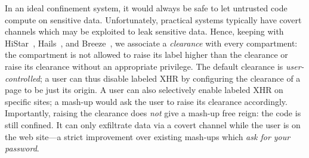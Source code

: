 In an ideal confinement system, it would always be safe to let untrusted
code compute on sensitive data.
%
Unfortunately, practical systems typically have covert channels which
may be exploited to leak sensitive data.
%
Hence, keeping with HiStar~\cite{Zeldovich:2006},
Hails~\cite{giffin:2012:hails}, and Breeze~\cite{Breeze13}, we associate
a \emph{clearance} with every compartment: the compartment is not
allowed to raise its label higher than the clearance or raise its
clearance without an appropriate privilege.
%
The default clearance is \emph{user-controlled}; a user can thus disable
labeled XHR by configuring the clearance of a page to be just
its origin.
%
A user can also selectively enable labeled XHR on specific sites; a
mash-up would ask the user to raise its clearance accordingly.
%
Importantly, raising the clearance does \emph{not} give a mash-up free reign:
the code is still confined.
%
It can only exfiltrate data via a covert channel while the user
is on the web site---a strict improvement over existing mash-ups which
\emph{ask for your password}.


